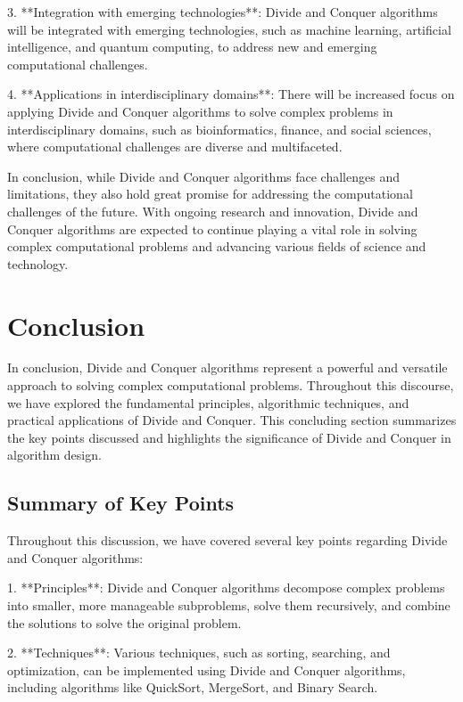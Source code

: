 \documentclass[12pt]{book} %
\begin{document}
3. **Integration with emerging technologies**: Divide and Conquer algorithms will be integrated with emerging technologies, such as machine learning, artificial intelligence, and quantum computing, to address new and emerging computational challenges.

4. **Applications in interdisciplinary domains**: There will be increased focus on applying Divide and Conquer algorithms to solve complex problems in interdisciplinary domains, such as bioinformatics, finance, and social sciences, where computational challenges are diverse and multifaceted.

In conclusion, while Divide and Conquer algorithms face challenges and limitations, they also hold great promise for addressing the computational challenges of the future. With ongoing research and innovation, Divide and Conquer algorithms are expected to continue playing a vital role in solving complex computational problems and advancing various fields of science and technology.


\section{Conclusion}

In conclusion, Divide and Conquer algorithms represent a powerful and versatile approach to solving complex computational problems. Throughout this discourse, we have explored the fundamental principles, algorithmic techniques, and practical applications of Divide and Conquer. This concluding section summarizes the key points discussed and highlights the significance of Divide and Conquer in algorithm design.

\subsection{Summary of Key Points}

Throughout this discussion, we have covered several key points regarding Divide and Conquer algorithms:

1. **Principles**: Divide and Conquer algorithms decompose complex problems into smaller, more manageable subproblems, solve them recursively, and combine the solutions to solve the original problem.

2. **Techniques**: Various techniques, such as sorting, searching, and optimization, can be implemented using Divide and Conquer algorithms, including algorithms like QuickSort, MergeSort, and Binary Search.
\end{document}
